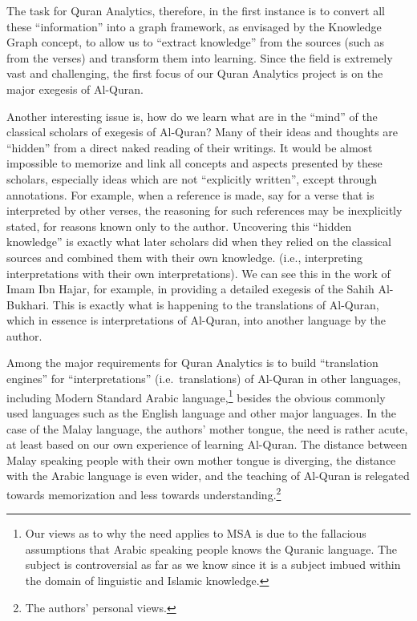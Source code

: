 \documentclass[
]{article}
\begin{document}
The task for Quran Analytics, therefore, in the first instance is to convert all these ``information'' into a graph framework, as envisaged by the Knowledge Graph concept, to allow us to ``extract knowledge'' from the sources (such as from the verses) and transform them into learning. Since the field is extremely vast and challenging, the first focus of our Quran Analytics project is on the major exegesis of Al-Quran.

Another interesting issue is, how do we learn what are in the ``mind'' of the classical scholars of exegesis of Al-Quran? Many of their ideas and thoughts are ``hidden'' from a direct naked reading of their writings. It would be almost impossible to memorize and link all concepts and aspects presented by these scholars, especially ideas which are not ``explicitly written'', except through annotations. For example, when a reference is made, say for a verse that is interpreted by other verses, the reasoning for such references may be inexplicitly stated, for reasons known only to the author. Uncovering this ``hidden knowledge'' is exactly what later scholars did when they relied on the classical sources and combined them with their own knowledge. (i.e., interpreting interpretations with their own interpretations). We can see this in the work of Imam Ibn Hajar, for example, in providing a detailed exegesis of the Sahih Al-Bukhari. This is exactly what is happening to the translations of Al-Quran, which in essence is interpretations of Al-Quran, into another language by the author.

Among the major requirements for Quran Analytics is to build ``translation engines'' for ``interpretations'' (i.e.~translations) of Al-Quran in other languages, including Modern Standard Arabic language,\footnote{Our views as to why the need applies to MSA is due to the fallacious assumptions that Arabic speaking people knows the Quranic language. The subject is controversial as far as we know since it is a subject imbued within the domain of linguistic and Islamic knowledge.} besides the obvious commonly used languages such as the English language and other major languages. In the case of the Malay language, the authors' mother tongue, the need is rather acute, at least based on our own experience of learning Al-Quran. The distance between Malay speaking people with their own mother tongue is diverging, the distance with the Arabic language is even wider, and the teaching of Al-Quran is relegated towards memorization and less towards understanding.\footnote{The authors' personal views.}
\end{document}
